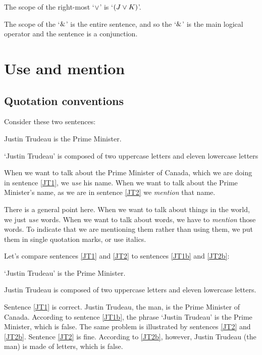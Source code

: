 \noindent The scope of the right-most `$\vee$' is `$(J \vee K)$'.

\noindent The scope of the `$\mathbin{\&}$' is the entire sentence, and so the `$\mathbin{\&}$' is the main logical operator and the sentence is a conjunction.







\chapter{Use and mention}\label{s:UseMention}

\section{Quotation conventions}
Consider these two sentences:
	\begin{earg}
		\item[\ex{JT1}] Justin Trudeau is the Prime Minister.
		\item[\ex{JT2}] `Justin Trudeau' is composed of two uppercase letters and eleven lowercase letters
	\end{earg}
When we want to talk about the Prime Minister of Canada, which we are doing in sentence \ref{JT1}, we \textit{use} his name. When we want to talk about the Prime Minister's name, as we are in sentence \ref{JT2} we \emph{mention} that name.

There is a general point here. When we want to talk about things in the world, we just \emph{use} words. When we want to talk about words, we have to \emph{mention} those words. To indicate that we are mentioning them rather than using them, we put them in single quotation marks, or use italics. 

Let's compare sentences \ref{JT1} and \ref{JT2} to sentences \ref{JT1b} and \ref{JT2b}:
	\begin{earg}
		\item[\ex{JT1b}] `Justin Trudeau' is the Prime Minister.
		\item[\ex{JT2b}] Justin Trudeau is composed of two uppercase letters and eleven lowercase letters.
	\end{earg}
Sentence \ref{JT1} is correct. Justin Trudeau, the man, is the Prime Minister of Canada. According to sentence \ref{JT1b}, the phrase `Justin Trudeau' is the Prime Minister, which is false. The same problem is illustrated by sentences \ref{JT2} and \ref{JT2b}. Sentence \ref{JT2} is fine. According to \ref{JT2b}, however, Justin Trudeau (the man) is made of letters, which is false. 

